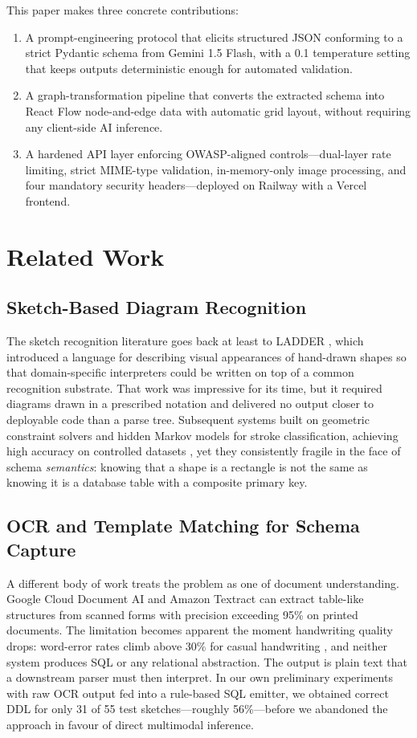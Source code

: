 \documentclass[conference]{IEEEtran}
\begin{document}
This paper makes three concrete contributions:
\begin{enumerate}
  \item A prompt-engineering protocol that elicits structured JSON
    conforming to a strict Pydantic schema from Gemini 1.5 Flash, with
    a 0.1 temperature setting that keeps outputs deterministic enough
    for automated validation.
  \item A graph-transformation pipeline that converts the extracted
    schema into React Flow node-and-edge data with automatic grid layout,
    without requiring any client-side AI inference.
  \item A hardened API layer enforcing OWASP-aligned controls---dual-layer
    rate limiting, strict MIME-type validation, in-memory-only image
    processing, and four mandatory security headers---deployed on
    Railway with a Vercel frontend.
\end{enumerate}

\section{Related Work}

\subsection{Sketch-Based Diagram Recognition}

The sketch recognition literature goes back at least to LADDER \cite{b2},
which introduced a language for describing visual appearances of
hand-drawn shapes so that domain-specific interpreters could be
written on top of a common recognition substrate. That work was
impressive for its time, but it required diagrams drawn in a
prescribed notation and delivered no output closer to deployable
code than a parse tree. Subsequent systems built on geometric
constraint solvers and hidden Markov models for stroke classification,
achieving high accuracy on controlled datasets \cite{b3}, yet they
consistently fragile in the face of schema \emph{semantics}: knowing
that a shape is a rectangle is not the same as knowing it is a
database table with a composite primary key.

\subsection{OCR and Template Matching for Schema Capture}

A different body of work treats the problem as one of document
understanding. Google Cloud Document AI and Amazon Textract can
extract table-like structures from scanned forms with
precision exceeding 95\% on printed documents. The limitation
becomes apparent the moment handwriting quality drops: word-error
rates climb above 30\% for casual handwriting \cite{b4}, and neither
system produces SQL or any relational abstraction. The output is
plain text that a downstream parser must then interpret. In our
own preliminary experiments with raw OCR output fed into a
rule-based SQL emitter, we obtained correct DDL for only 31 of 55
test sketches---roughly 56\%---before we abandoned the approach
in favour of direct multimodal inference.
\end{document}
